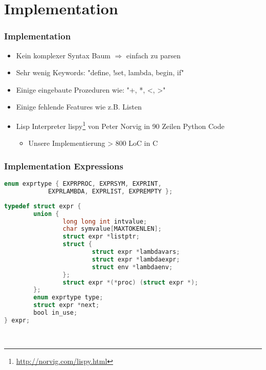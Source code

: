 \section[Implementation]{Implementation}

\begin{frame}
    \frametitle{Implementation}
    \begin{itemize}
	\item Kein komplexer Syntax Baum $\Rightarrow$ einfach zu parsen
	\item Sehr wenig Keywords: "define, !set, lambda, begin, if"
	\item Einige eingebaute Prozeduren wie: "+, *, <, >" 
	\item Einige fehlende Features wie z.B. Listen
	\item Lisp Interpreter lispy\footnote{\url{http://norvig.com/lispy.html}} von Peter Norvig 
		in 90 Zeilen Python Code
		\pause
		\begin{itemize}
			\item Unsere Implementierung > 800 LoC in C
		\end{itemize}
    \end{itemize}
\end{frame}

\begin{frame}[fragile]
    \frametitle{Implementation Expressions}
	\begin{lstlisting}[language=C]
	enum exprtype { EXPRPROC, EXPRSYM, EXPRINT, 
			EXPRLAMBDA, EXPRLIST, EXPREMPTY };
	\end{lstlisting}
	\begin{lstlisting}[language=C]
	typedef struct expr {
        union {
                long long int intvalue;
                char symvalue[MAXTOKENLEN];
                struct expr *listptr;
                struct {
                        struct expr *lambdavars;
                        struct expr *lambdaexpr;
                        struct env *lambdaenv;
                };
                struct expr *(*proc) (struct expr *);
        };
        enum exprtype type;
        struct expr *next;
        bool in_use;
} expr;

	\end{lstlisting}
\end{frame}
~               
